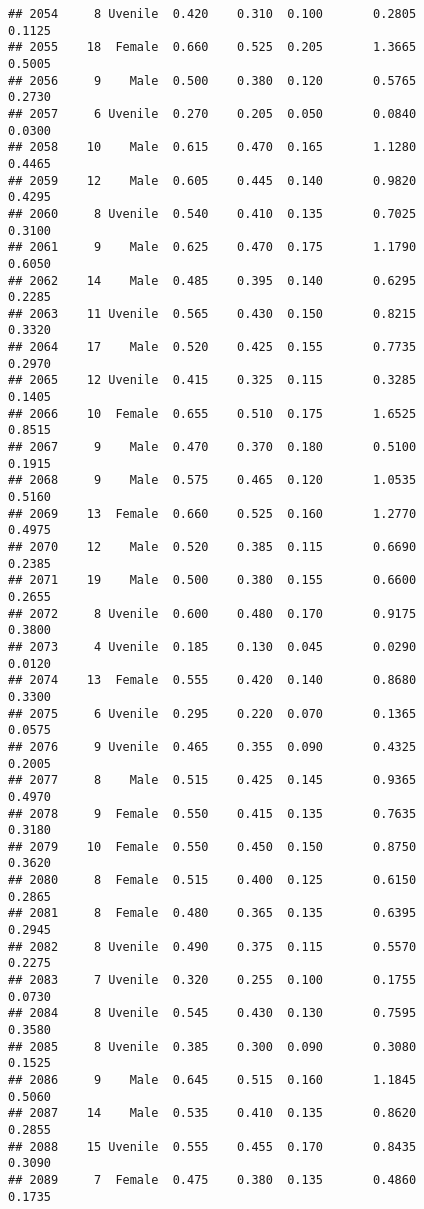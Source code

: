 \documentclass[
]{article}
\begin{document}
\begin{verbatim}
## 2054     8 Uvenile  0.420    0.310  0.100       0.2805         0.1125
## 2055    18  Female  0.660    0.525  0.205       1.3665         0.5005
## 2056     9    Male  0.500    0.380  0.120       0.5765         0.2730
## 2057     6 Uvenile  0.270    0.205  0.050       0.0840         0.0300
## 2058    10    Male  0.615    0.470  0.165       1.1280         0.4465
## 2059    12    Male  0.605    0.445  0.140       0.9820         0.4295
## 2060     8 Uvenile  0.540    0.410  0.135       0.7025         0.3100
## 2061     9    Male  0.625    0.470  0.175       1.1790         0.6050
## 2062    14    Male  0.485    0.395  0.140       0.6295         0.2285
## 2063    11 Uvenile  0.565    0.430  0.150       0.8215         0.3320
## 2064    17    Male  0.520    0.425  0.155       0.7735         0.2970
## 2065    12 Uvenile  0.415    0.325  0.115       0.3285         0.1405
## 2066    10  Female  0.655    0.510  0.175       1.6525         0.8515
## 2067     9    Male  0.470    0.370  0.180       0.5100         0.1915
## 2068     9    Male  0.575    0.465  0.120       1.0535         0.5160
## 2069    13  Female  0.660    0.525  0.160       1.2770         0.4975
## 2070    12    Male  0.520    0.385  0.115       0.6690         0.2385
## 2071    19    Male  0.500    0.380  0.155       0.6600         0.2655
## 2072     8 Uvenile  0.600    0.480  0.170       0.9175         0.3800
## 2073     4 Uvenile  0.185    0.130  0.045       0.0290         0.0120
## 2074    13  Female  0.555    0.420  0.140       0.8680         0.3300
## 2075     6 Uvenile  0.295    0.220  0.070       0.1365         0.0575
## 2076     9 Uvenile  0.465    0.355  0.090       0.4325         0.2005
## 2077     8    Male  0.515    0.425  0.145       0.9365         0.4970
## 2078     9  Female  0.550    0.415  0.135       0.7635         0.3180
## 2079    10  Female  0.550    0.450  0.150       0.8750         0.3620
## 2080     8  Female  0.515    0.400  0.125       0.6150         0.2865
## 2081     8  Female  0.480    0.365  0.135       0.6395         0.2945
## 2082     8 Uvenile  0.490    0.375  0.115       0.5570         0.2275
## 2083     7 Uvenile  0.320    0.255  0.100       0.1755         0.0730
## 2084     8 Uvenile  0.545    0.430  0.130       0.7595         0.3580
## 2085     8 Uvenile  0.385    0.300  0.090       0.3080         0.1525
## 2086     9    Male  0.645    0.515  0.160       1.1845         0.5060
## 2087    14    Male  0.535    0.410  0.135       0.8620         0.2855
## 2088    15 Uvenile  0.555    0.455  0.170       0.8435         0.3090
## 2089     7  Female  0.475    0.380  0.135       0.4860         0.1735

\end{verbatim}
\end{document}
